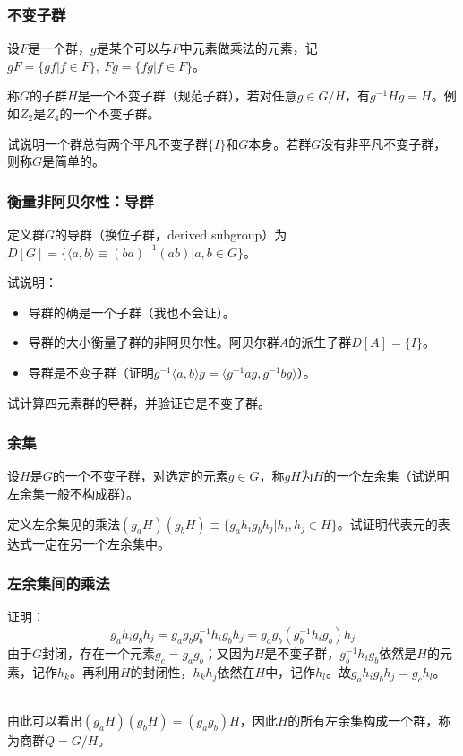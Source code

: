 \documentclass[CJK]{beamer}
\begin{document}
\begin{frame}
\frametitle{\bch 不变子群 \ech}
\bch
设$F$是一个群，$g$是某个可以与$F$中元素做乘法的元素，记$gF = \{ gf | f \in F\},\ Fg = \{ fg | f \in F\}$。
\par
称$G$的子群$H$是一个不变子群（规范子群），若对任意$g \in G/H$，有$g^{-1} H g = H$。例如$Z_2$是$Z_4$的一个不变子群。
\par
试说明一个群总有两个平凡不变子群$\{I\}$和$G$本身。若群$G$没有非平凡不变子群，则称$G$是简单的。


\ech
\end{frame}


\begin{frame}
\frametitle{\bch 衡量非阿贝尔性：导群 \ech}
\bch
定义群$G$的导群（换位子群，derived subgroup）为$D[G] = \{ \langle a,b \rangle \equiv (ba)^{-1} (ab) | a,b \in G \}$。\par
试说明：
\begin{itemize}
\item 导群的确是一个子群（我也不会证）。
\item 导群的大小衡量了群的非阿贝尔性。阿贝尔群$A$的派生子群$D[A] = \{I\}$。
\item 导群是不变子群（证明$g^{-1} \langle a,b \rangle g = \langle g^{-1} a g , g^{-1} b g \rangle$）。
\end{itemize}
试计算四元素群的导群，并验证它是不变子群。

\ech
\end{frame}


\begin{frame}
\frametitle{\bch 余集 \ech}
\bch
设$H$是$G$的一个不变子群，对选定的元素$g \in G$，称$gH$为$H$的一个左余集（试说明左余集一般不构成群）。
\par
定义左余集见的乘法$(g_a H) (g_b H) \equiv \{ g_a h_i g_b h_j | h_i,h_j \in H\}$。试证明代表元的表达式一定在另一个左余集中。


\ech
\end{frame}

\begin{frame}
\frametitle{\bch 左余集间的乘法 \ech}
\bch
证明：{\blue 
$$ g_a h_i g_b h_j = g_a g_b g_b^{-1} h_i g_b h_j = g_a g_b (g_b^{-1} h_i g_b ) h_j$$
由于$G$封闭，存在一个元素$g_c = g_a g_b$；又因为$H$是不变子群，$g_b^{-1} h_i g_b$依然是$H$的元素，记作$h_k$。再利用$H$的封闭性，$h_k h_j$依然在$H$中，记作$h_l$。故$g_a h_i g_b h_j = g_c h_l$。 }
\par \ \\
由此可以看出$(g_a H) (g_b H) = (g_a g_b) H$，因此$H$的所有左余集构成一个群，称为商群$Q = G/H$。


\ech
\end{frame}
\end{document}
